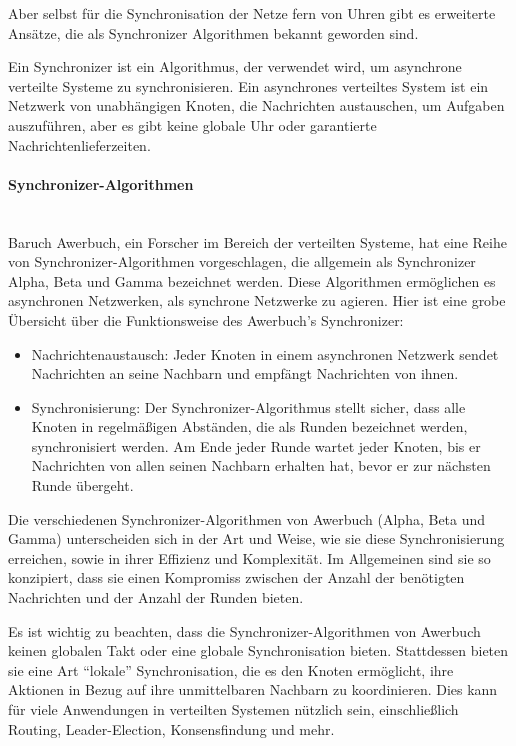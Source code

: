 Aber selbst für die Synchronisation der Netze fern von Uhren gibt es erweiterte Ansätze, die als Synchronizer Algorithmen bekannt geworden sind. 

Ein Synchronizer ist ein Algorithmus, der verwendet wird, um asynchrone verteilte Systeme zu synchronisieren. Ein asynchrones verteiltes System ist ein Netzwerk von unabhängigen Knoten, die Nachrichten austauschen, um Aufgaben auszuführen, aber es gibt keine globale Uhr oder garantierte Nachrichtenlieferzeiten.
\paragraph{Synchronizer-Algorithmen\\\\}
Baruch Awerbuch, ein Forscher im Bereich der verteilten Systeme, hat eine Reihe von Synchronizer-Algorithmen vorgeschlagen, die allgemein als Synchronizer Alpha, Beta und Gamma bezeichnet werden. Diese Algorithmen ermöglichen es asynchronen Netzwerken, als synchrone Netzwerke zu agieren.
Hier ist eine grobe Übersicht über die Funktionsweise des Awerbuch's Synchronizer:
\begin{itemize}
\item Nachrichtenaustausch: Jeder Knoten in einem asynchronen Netzwerk sendet Nachrichten an seine Nachbarn und empfängt Nachrichten von ihnen.
\item Synchronisierung: Der Synchronizer-Algorithmus stellt sicher, dass alle Knoten in regelmäßigen Abständen, die als Runden bezeichnet werden, synchronisiert werden. Am Ende jeder Runde wartet jeder Knoten, bis er Nachrichten von allen seinen Nachbarn erhalten hat, bevor er zur nächsten Runde übergeht.
\end{itemize}    
Die verschiedenen Synchronizer-Algorithmen von Awerbuch (Alpha, Beta und Gamma) unterscheiden sich in der Art und Weise, wie sie diese Synchronisierung erreichen, sowie in ihrer Effizienz und Komplexität. Im Allgemeinen sind sie so konzipiert, dass sie einen Kompromiss zwischen der Anzahl der benötigten Nachrichten und der Anzahl der Runden bieten.

Es ist wichtig zu beachten, dass die Synchronizer-Algorithmen von Awerbuch keinen globalen Takt oder eine globale Synchronisation bieten. Stattdessen bieten sie eine Art \enquote{lokale} Synchronisation, die es den Knoten ermöglicht, ihre Aktionen in Bezug auf ihre unmittelbaren Nachbarn zu koordinieren. Dies kann für viele Anwendungen in verteilten Systemen nützlich sein, einschließlich Routing, Leader-Election, Konsensfindung und mehr.

